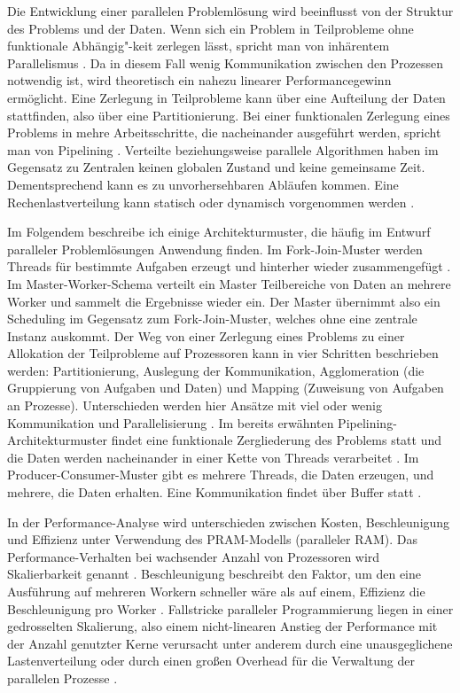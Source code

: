 \documentclass[a4paper,12pt,twoside]{article}
\begin{document}
Die Entwicklung einer parallelen Problemlösung wird beeinflusst von der Struktur des Problems und der Daten. Wenn sich ein Problem in Teilprobleme ohne funktionale Abhängig"-keit zerlegen lässt, spricht man von inhärentem Parallelismus \parencite[S. 321f]{Bengel2008}. Da in diesem Fall wenig Kommunikation zwischen den Prozessen notwendig ist, wird theoretisch ein nahezu linearer Performancegewinn ermöglicht. Eine Zerlegung in Teilprobleme kann über eine Aufteilung der Daten stattfinden, also über eine Partitionierung. Bei einer funktionalen Zerlegung eines Problems in mehre Arbeitsschritte, die nacheinander ausgeführt werden, spricht man von Pipelining \parencite[S. 324]{Bengel2008}. Verteilte beziehungsweise parallele Algorithmen haben im Gegensatz zu Zentralen keinen globalen Zustand und keine gemeinsame Zeit. Dementsprechend kann es zu unvorhersehbaren Abläufen kommen. Eine Rechenlastverteilung kann statisch oder dynamisch vorgenommen werden \parencite{Bengel2008}.

Im Folgendem beschreibe ich einige Architekturmuster, die häufig im Entwurf paralleler Problemlösungen Anwendung finden. Im Fork-Join-Muster werden Threads für bestimmte Aufgaben erzeugt und hinterher wieder zusammengefügt \parencite[S. 109]{Rauber2013}. Im Master-Worker-Schema verteilt ein Master Teilbereiche von Daten an mehrere Worker und sammelt die Ergebnisse wieder ein. Der Master übernimmt also ein Scheduling im Gegensatz zum Fork-Join-Muster, welches ohne eine zentrale Instanz auskommt. Der Weg von einer Zerlegung eines Problems zu einer Allokation der Teilprobleme auf Prozessoren kann in vier Schritten beschrieben werden: Partitionierung, Auslegung der Kommunikation, Agglomeration (die Gruppierung von Aufgaben und Daten) und Mapping (Zuweisung von Aufgaben an Prozesse). Unterschieden werden hier Ansätze mit viel oder wenig Kommunikation und Parallelisierung \parencite[S. 326f]{Bengel2008}. Im bereits erwähnten Pipelining-Architekturmuster findet eine funktionale Zergliederung des Problems statt und die Daten werden nacheinander in einer Kette von Threads verarbeitet \parencite[S. 111]{Rauber2013}. Im Producer-Consumer-Muster gibt es mehrere Threads, die Daten erzeugen, und mehrere, die Daten erhalten. Eine Kommunikation findet über Buffer statt \parencite[S. 112]{Rauber2013}.

In der Performance-Analyse wird unterschieden zwischen Kosten, Beschleunigung und Effizienz unter Verwendung des PRAM-Modells (paralleler RAM). Das Performance-Verhalten bei wachsender Anzahl von Prozessoren wird Skalierbarkeit genannt \parencite{Rauber2013}. Beschleunigung beschreibt den Faktor, um den eine Ausführung auf mehreren Workern schneller wäre als auf einem, Effizienz die Beschleunigung pro Worker \parencite[S. 56]{McCool2012}. Fallstricke paralleler Programmierung liegen in einer gedrosselten Skalierung, also einem nicht-linearen Anstieg der Performance mit der Anzahl genutzter Kerne verursacht unter anderem durch eine unausgeglichene Lastenverteilung oder durch einen großen Overhead für die Verwaltung der parallelen Prozesse \parencite[S. 74]{McCool2012}.
\end{document}
